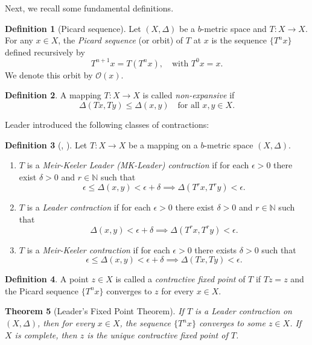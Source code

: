 \documentclass{birkjour}
\newtheorem{thm}{Theorem}[section]
\theoremstyle{definition}
\newtheorem{defn}[thm]{Definition}
\theoremstyle{remark}
\numberwithin{equation}{section}
\begin{document}
\medskip

Next, we recall some fundamental definitions.

\begin{defn}[Picard sequence]
Let \((X,\Delta)\) be a \(b\)-metric space and \(T: X \to X\). For any \(x \in X\), the \emph{Picard sequence} (or orbit) of \(T\) at \(x\) is the sequence \(\{T^n x\}\) defined recursively by
\[
T^{n+1} x = T(T^n x), \quad \text{with } T^0 x = x.
\]
We denote this orbit by \(\mathcal{O}(x)\).
\end{defn}

\begin{defn}
A mapping \(T: X \to X\) is called \emph{non-expansive} if
\[
\Delta(Tx, Ty) \leq \Delta(x,y) \quad \text{for all } x,y \in X.
\]
\end{defn}

Leader \cite{leader1983equivalent} introduced the following classes of contractions:

\begin{defn}[\cite{keeler1969theorem}, \cite{leader1983equivalent}]
Let \(T: X \to X\) be a mapping on a \(b\)-metric space \((X,\Delta)\).
\begin{enumerate}
    \item \(T\) is a \emph{Meir-Keeler Leader (MK-Leader) contraction} if for each \(\epsilon > 0\) there exist \(\delta > 0\) and \(r \in \mathbb{N}\) such that
    \[
    \epsilon \leq \Delta(x,y) < \epsilon + \delta \implies \Delta(T^r x, T^r y) < \epsilon.
    \]
    \item \(T\) is a \emph{Leader contraction} if for each \(\epsilon > 0\) there exist \(\delta > 0\) and \(r \in \mathbb{N}\) such that
    \[
    \Delta(x,y) < \epsilon + \delta \implies \Delta(T^r x, T^r y) < \epsilon.
    \]
    \item \(T\) is a \emph{Meir-Keeler contraction} if for each \(\epsilon > 0\) there exists \(\delta > 0\) such that
    \[
    \epsilon \leq \Delta(x,y) < \epsilon + \delta \implies \Delta(T x, T y) < \epsilon.
    \]
\end{enumerate}
\end{defn}

\begin{defn}
A point \(z \in X\) is called a \emph{contractive fixed point} of \(T\) if \(T z = z\) and the Picard sequence \(\{T^n x\}\) converges to \(z\) for every \(x \in X\).
\end{defn}

\begin{thm}[Leader's Fixed Point Theorem]\label{leader_fixed}
If \(T\) is a Leader contraction on \((X,\Delta)\), then for every \(x \in X\), the sequence \(\{T^n x\}\) converges to some \(z \in X\). If \(X\) is complete, then \(z\) is the unique contractive fixed point of \(T\).
\end{thm}
\end{document}
